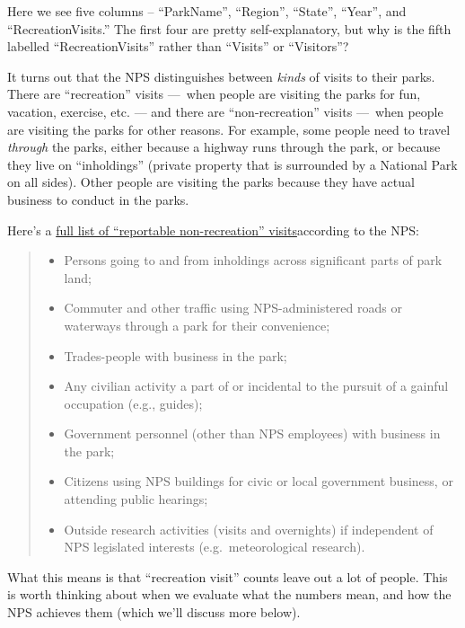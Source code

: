 \documentclass[
  letterpaper,
  DIV=11,
  numbers=noendperiod]{scrartcl}
\providecommand{\tightlist}{%
  \setlength{\itemsep}{0pt}\setlength{\parskip}{0pt}}\usepackage{longtable,booktabs,array}
\begin{document}
Here we see five columns -- ``ParkName'', ``Region'', ``State'',
``Year'', and ``RecreationVisits.'' The first four are pretty
self-explanatory, but why is the fifth labelled ``RecreationVisits''
rather than ``Visits'' or ``Visitors''?

It turns out that the NPS distinguishes between \emph{kinds} of visits
to their parks. There are ``recreation'' visits ---~when people are
visiting the parks for fun, vacation, exercise, etc. --- and there are
``non-recreation'' visits ---~when people are visiting the parks for
other reasons. For example, some people need to travel \emph{through}
the parks, either because a highway runs through the park, or because
they live on ``inholdings'' (private property that is surrounded by a
National Park on all sides). Other people are visiting the parks because
they have actual business to conduct in the parks.

Here's a
\href{https://www.nps.gov/subjects/socialscience/nps-visitor-use-statistics-definitions.htm}{full
list of ``reportable non-recreation'' visits}according to the NPS:

\begin{quote}
\begin{itemize}
\tightlist
\item
  Persons going to and from inholdings across significant parts of park
  land;
\item
  Commuter and other traffic using NPS-administered roads or waterways
  through a park for their convenience;
\item
  Trades-people with business in the park;
\item
  Any civilian activity a part of or incidental to the pursuit of a
  gainful occupation (e.g., guides);
\item
  Government personnel (other than NPS employees) with business in the
  park;
\item
  Citizens using NPS buildings for civic or local government business,
  or attending public hearings;
\item
  Outside research activities (visits and overnights) if independent of
  NPS legislated interests (e.g.~meteorological research).
\end{itemize}
\end{quote}

What this means is that ``recreation visit'' counts leave out a lot of
people. This is worth thinking about when we evaluate what the numbers
mean, and how the NPS achieves them (which we'll discuss more below).
\end{document}
